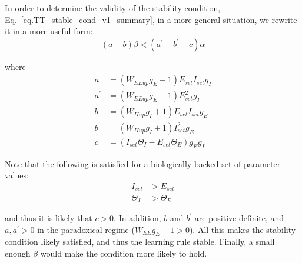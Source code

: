 \documentclass[twocolumn]{article}
\newcommand{\EE}{\mathit{EE}}
\newcommand{\II}{\mathit{II}}
\newcommand{\set}{\mathit{set}}
\newcommand{\up}{\mathit{up}}
\begin{document}
In order to determine the validity of the stability condition, Eq.\ \ref{eq.TT_stable_cond_v1_summary}, in a more general situation, we rewrite it in a more useful form:
\begin{equation}
(a - b)\beta < (a^\prime + b^\prime + c) \alpha
\label{eq.TT_stable_cond_v2_summary}
\end{equation}

\noindent where
\begin{displaymath}
\begin{aligned}
a & = (W_{\EE\up}g_E - 1) E_{\set} I_{\set} g_I \\
a^\prime & = (W_{\EE\up}g_E - 1)E_{\set}^2 g_I \\
b & = (W_{\II\up}g_I + 1) E_{\set} I_{\set} g_E \\
b^\prime & = (W_{\II\up}g_I + 1)I_{\set}^2 g_E \\
c & = (I_{\set}\Theta_I - E_{\set}\Theta_E)g_E g_I
\end{aligned}
\end{displaymath}

\noindent Note that the following is satisfied for a biologically backed set of parameter values:
\begin{displaymath}
\begin{aligned}
I_{\set} & > E_{\set} \\
\Theta_I & > \Theta_E
\end{aligned}
\end{displaymath}

\noindent and thus it is likely that $c>0$. In addition, $b$ and $b^\prime$ are positive definite, and $a,a^\prime>0$ in the paradoxical regime ($W_{\EE}g_E - 1 > 0$). All this makes the stability condition likely satisfied, and thus the learning rule stable. Finally, a small enough $\beta$ would make the condition more likely to hold.
\end{document}
